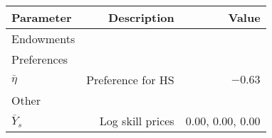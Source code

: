 \begin{tabular}{lrr}
\hline
Parameter & Description  & Value  \\ 
\hline
Endowments &   &   \\ 
Preferences &   &   \\ 
$\bar{\eta}$ & Preference for HS  & $-0.63$  \\ 
Other &   &   \\ 
$\bar{Y}_{s}$ & Log skill prices  & 0.00, 0.00, 0.00  \\ 
\hline
\end{tabular}%
